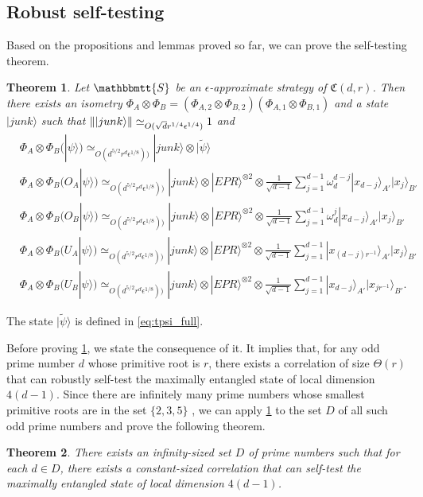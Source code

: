 \documentclass[11pt,letterpaper]{article}
\newcommand{\ket}[1]{|#1\rangle}
\newcommand{\x}{\otimes}
\DeclarePairedDelimiter{\norm}{\lVert}{\rVert}
\newcommand{\1}{\mathbb{1}}
\newcommand{\tpsi}{\tilde{\psi}}
\newcommand{\fC}{\mathfrak{C}}
\newcommand{\bS}{\mathbbmtt{S}}
\newcommand{\ep}{\epsilon}
\newcommand{\qe}{\epsilon^{1/4}}
\newcommand{\sd}{\sqrt{d}}
\newcommand{\qr}{r^{1/4}}
\newcommand{\appd}[1]{\simeq_{#1}}
\newtheorem{theorem}{Theorem}[section]
\theoremstyle{definition}
\begin{document}
\subsection{Robust self-testing}
\label{sec:self-test}
Based on the propositions and lemmas proved so far, we can prove the self-testing theorem.
\begin{theorem}
	\label{thm:self-test}
	Let $\bS$ be an $\ep$-approximate strategy of $\fC(d,r)$.
	Then there exists an isometry   
	$\Phi_A \x \Phi_B = (\Phi_{A,2} \x \Phi_{B,2})(\Phi_{A,1}\x\Phi_{B,1})$ and a state $\ket{junk}$
	such that $\norm{\ket{junk}} \appd{O(\sd \qr \qe)} 1$ and 
	\begin{align}
		&\Phi_A \x \Phi_B (\ket{\psi}) \appd{O(d^{5/2} r^{d} \ep^{1/8}))} \ket{junk} \x \ket{\tpsi}\\	
		&\Phi_A \x \Phi_B (O_A\ket{\psi}) \appd{O(d^{5/2} r^{d}\ep^{1/8}))} \ket{junk} \x \ket{EPR}^{\x 2} \x
		\frac{1}{\sqrt{d-1}}\sum_{j=1}^{d-1} \omega_d^{d-j}\ket{x_{d-j}}_{A'}\ket{x_j}_{B'} \\
		&\Phi_A \x \Phi_B (O_B\ket{\psi}) \appd{O(d^{5/2} r^{d} \ep^{1/8}))} \ket{junk} \x \ket{EPR}^{\x 2} \x
		\frac{1}{\sqrt{d-1}}\sum_{j=1}^{d-1} \omega_d^{j}\ket{x_{d-j}}_{A'}\ket{x_j}_{B'}\\
		&\Phi_A \x \Phi_B (U_A\ket{\psi}) \appd{O(d^{5/2} r^{d}  \ep^{1/8}))} \ket{junk} \x \ket{EPR}^{\x 2} \x
		\frac{1}{\sqrt{d-1}}\sum_{j=1}^{d-1} \ket{x_{(d-j)r^{-1}}}_{A'}\ket{x_j}_{B'} \\
		&\Phi_A \x \Phi_B (U_B\ket{\psi}) \appd{O(d^{5/2} r^{d}\ep^{1/8}))} \ket{junk} \x \ket{EPR}^{\x 2} \x
		\frac{1}{\sqrt{d-1}}\sum_{j=1}^{d-1} \ket{x_{d-j}}_{A'}\ket{x_{j r^{-1}}}_{B'}.
	\end{align}
\end{theorem}
The state $\ket{\tpsi}$ is defined in \cref{eq:tpsi_full}.

Before proving \cref{thm:self-test}, we state the consequence of it.
It implies that,
for any odd prime number $d$ whose primitive root is $r$, 
there exists a correlation of size $\Theta(r)$ that can robustly self-test the maximally
entangled state of local dimension $4(d-1)$.
Since there are infinitely many prime numbers
whose smallest primitive roots are in the set $\{2,3,5\}$ \cite{murty1988},
we can apply \cref{thm:self-test} to the set $D$
of all such odd prime
numbers and prove the following theorem.
\begin{theorem}
	\label{thm:infty}
	There exists an infinity-sized set $D$ of prime numbers such that 
	for each $d \in D$, there exists
	a constant-sized correlation that can self-test the maximally entangled state
	of local dimension $4(d-1)$.
\end{theorem}
\end{document}
